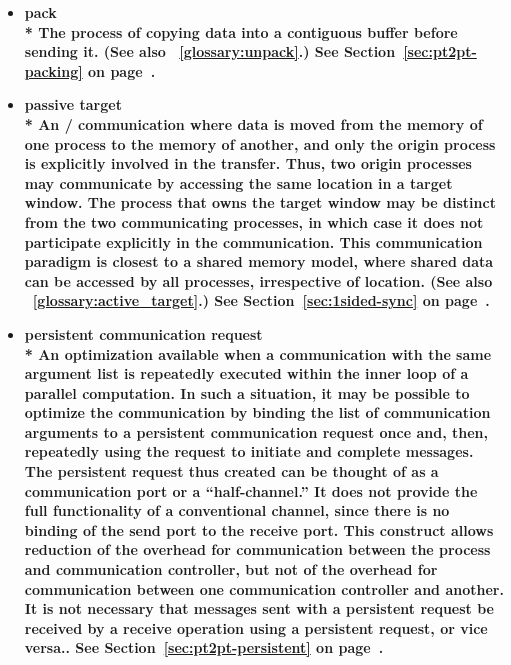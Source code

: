 \begin{itemize}
\label{glossary:pack}
\item \bf{ pack} \\*
The process of copying data into a contiguous buffer
before sending it. (See also ~\ref{glossary:unpack}.)
See Section~\ref{sec:pt2pt-packing} on page~\pageref{sec:pt2pt-packing}.

\label{glossary:passive_target}
\item \bf{ passive target} \\*
An \RMA/ communication where data is moved from the memory of one
process to the memory of another, and only the origin process is
explicitly involved
in
the transfer.  Thus, two origin processes may communicate by accessing
the same location in a target window.  The process that owns the
target window may be distinct from the two communicating processes, 
in which case it does not participate explicitly in the communication.
This communication
paradigm is closest to a shared memory model, where shared data can be
accessed by all processes, irrespective 
of location. (See also ~\ref{glossary:active_target}.)
See Section~\ref{sec:1sided-sync} on page~\pageref{sec:1sided-sync}.

\label{glossary:persistent_communication_request}
\item \bf{ persistent communication request} \\*
An optimization available when a communication with the same argument list is repeatedly
executed within the inner loop of a parallel computation.  In such a
situation, it may be possible to optimize the communication by
binding the list of communication arguments to a {\bf persistent} communication
request once and, then, repeatedly using
the request to initiate and complete messages.  The
persistent request thus created can be thought of as a
communication port or a ``half-channel.''
It does not provide the full functionality of a conventional channel,
since there is no binding of the send port to the receive port. This
construct allows reduction of the overhead for communication
between the process and communication controller, but not of the overhead for
communication between one communication controller and another.
It is not necessary that messages sent with a persistent request be received
by a receive operation using a persistent request, or vice versa..
See Section~\ref{sec:pt2pt-persistent} on page~\pageref{sec:pt2pt-persistent}.


\end{itemize}
